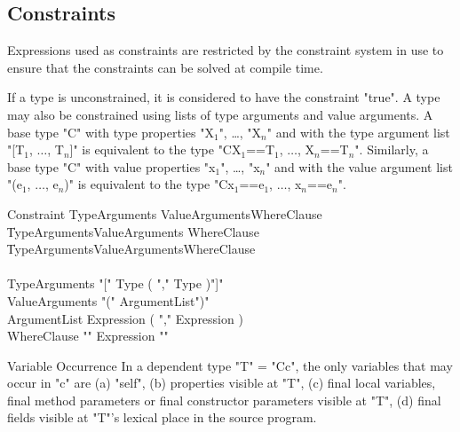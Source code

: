 \subsection{Constraints}

Expressions used as constraints are restricted by the
constraint system in use to ensure that the constraints can
be solved at compile time.

If a type is unconstrained, it is considered to have the
constraint \xcd"true".
A type may also be constrained using lists of type arguments and
value arguments.  A base type \xcd"C" with type properties
\xcdmath"X$_1$", \dots,
\xcdmath"X$_n$" and
with the type argument list
\xcdmath"[T$_1$, $\dots$, T$_n$]" is equivalent to the type
\xcdmath"C{X$_1$==T$_1$, $\dots$, X$_n$==T$_n$}".
Similarly, a base type \xcd"C" with value properties
\xcdmath"x$_1$", \dots,
\xcdmath"x$_n$" and
with the value argument list
\xcdmath"(e$_1$, $\dots$, e$_n$)" is equivalent to the type
\xcdmath"C{x$_1$==e$_1$, $\dots$, x$_n$==e$_n$}".

\def\withmath#1{\relax\ifmmode#1\else{$#1$}\fi}
\def\LL#1{\withmath{\lbrack\!\lbrack #1\rbrack\!\rbrack}}

\begin{grammar}
Constraint \: TypeArguments     ValueArguments\opt WhereClause\opt \\
           \| TypeArguments\opt ValueArguments     WhereClause\opt \\
           \| TypeArguments\opt ValueArguments\opt WhereClause     \\
           \\
TypeArguments    \:  \xcd"[" Type ( \xcd"," Type )\star \xcd"]" \\
ValueArguments   \:  \xcd"(" ArgumentList\opt \xcd")" \\
ArgumentList     \:  Expression ( \xcd"," Expression )\star \\
WhereClause        \: \xcd"{" Expression \xcd"}" \\
\end{grammar}

\begin{staticrule}{Variable Occurrence}
In a dependent type \xcd"T" = \xcd"C{c}", the only variables that may
occur in \xcd"c" are (a)
\xcd"self", (b) properties visible at \xcd"T", (c) final local variables, final
method parameters or final constructor parameters visible at \xcd"T", (d)
final fields visible at \xcd"T"'s lexical place in the source program.  
\end{staticrule}

